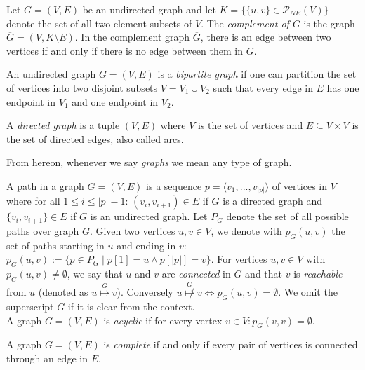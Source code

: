 \begin{definition}\label{def: complement graph}
Let $G=(V,E)$ be an undirected graph and let 
$K = \{ \{u,v\} \in \mathcal{P}_{NE}(V)\}$ 
denote the set of all two-element subsets of $V$.
The \emph{complement of $G$} is the graph $\overline{G}=(V,K \setminus E)$.
In the complement graph $\overline{G}$, there is an edge between two vertices if and only if there is no edge between them in $G$.
\end{definition}



\begin{definition}
An undirected graph $G=(V,E)$ is a \emph{bipartite graph} if one can partition the set of vertices into two disjoint subsets $V=V_1 \cup V_2$ such that every edge in $E$ has one endpoint in $V_1$ and one endpoint in $V_2$.
\end{definition}


\begin{definition}
A \emph{directed graph} is a tuple $(V,E)$ where $V$ is the set of vertices and $E \subseteq V \times V$ is the set of directed edges, also called arcs.
\end{definition}

From hereon, whenever we say \textit{graphs} we mean any type of graph.


\begin{definition}
A path in a graph $G=(V,E)$ is a sequence 
$p=\langle v_1,...,v_{|p|} \rangle$ of vertices in $V$ where for all $1 \leq i \leq |p|-1$:
$(v_i,v_{i+1}) \in E$ if $G$ is a directed graph and $\{v_i,v_{i+1}\} \in E$ if $G$ is an undirected graph.
Let $P_G$ denote the set of all possible paths over graph $G$.
Given two vertices $u,v \in V$, we denote with $p_G(u,v)$ the set of paths starting in $u$ and ending in $v$:
$p_G(u,v):= \{p \in P_G \mid p[1]=u \wedge p[|p|]=v\}$.
For vertices $u,v \in V$ with $p_G(u,v) \neq \emptyset$, we say that $u$ and $v$ are \emph{connected} in $G$ and that $v$ is \emph{reachable} from $u$ (denoted as $u \overset{G}{\mapsto} v$).
Conversely $u \overset{G}{\not \mapsto} v \Leftrightarrow p_G(u,v) = \emptyset$.
We omit the superscript $G$ if it is clear from the context.\\
A graph $G=(V,E)$ is \emph{acyclic} if for every vertex $v \in V: p_G(v,v)=\emptyset$.
\end{definition}


\begin{definition}
A graph $G=(V,E)$ is \emph{complete} if and only if every pair of vertices is connected through an edge in $E$.
\end{definition}


